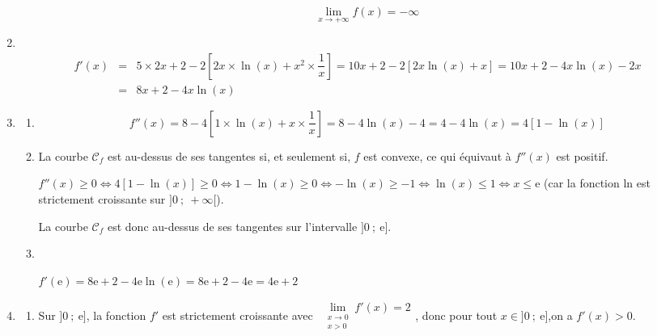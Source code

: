 \documentclass[10pt]{article}
\begin{document}
\begin{enumerate}
\begin{enumerate}
		\[\boxed{\lim_{x \to +\infty}f(x) = -\infty}\]
	\end{enumerate}
	\item\
	\begin{eqnarray*}
		f'(x) &=& 5 \times 2x + 2 - 2 \left[ 2x \times \ln(x) + x^2 \times \dfrac{1}{x}\right] = 10x + 2 - 2\left[2x\ln(x) + x\right] = 10x + 2 - 4x\ln(x) - 2x\\
		&=& \boxed{8x + 2 - 4x\ln(x)}
	\end{eqnarray*}
	\item
	\begin{enumerate}
		\item
		\[f''(x) = 8 - 4\left[1 \times \ln(x) + x \times \dfrac{1}{x}\right] = 8 - 4\ln (x) - 4 = 4 - 4\ln(x) = \boxed{4\left[1-\ln(x)\right]}\]
		\item La courbe $\mathcal{C}_f$ est au-dessus de ses tangentes si, et seulement si, $f$ est convexe, ce qui équivaut à $f''(x)$ est positif.
		
		$f''(x) \geqslant 0 \iff 4\left[1-\ln(x)\right] \geqslant 0 \iff 1-\ln(x) \geqslant 0 \iff -\ln(x) \geqslant -1 \iff \ln(x) \leqslant 1 \iff x \leqslant \text{e}$ (car la fonction ln est strictement croissante sur $]0~;~+\infty[$).\\
		\smallskip
		
		La courbe $\mathcal{C}_f$ est donc au-dessus de ses tangentes sur l'intervalle $]0~;~\text{e}]$.
		\item\
		\begin{center}
		
		$f'(\text{e}) = 8\text{e} + 2 - 4\text{e} \ln(\text{e}) = 8\text{e} + 2 - 4\text{e} = 4\text{e} + 2$
		\end{center}
	\end{enumerate}
	\item
	\begin{enumerate}
		\item Sur $]0~;~\text{e}]$, la fonction $f'$ est strictement croissante avec $\begin{gathered}\lim\limits_{\substack{x \to 0\\x>0}}f'(x) = 2\end{gathered}$, donc pour tout $x \in ]0~;~\text{e}]$,on a $f'(x) > 0$.\\
		\smallskip
		

\end{enumerate}
\end{enumerate}
\end{document}
